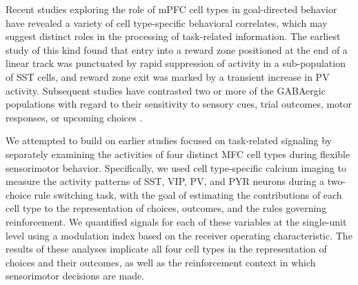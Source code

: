 Recent studies exploring the role of mPFC cell types in goal-directed behavior have revealed a variety of cell type-specific behavioral correlates, which may suggest distinct roles in the processing of task-related information. The earliest study of this kind \citep{kvitsiani2013distinct} found that entry into a reward zone positioned at the end of a linear track was punctuated by rapid suppression of activity in a sub-population of SST cells, and reward zone exit was marked by a transient increase in PV activity. Subsequent studies have contrasted two or more of the GABAergic populations with regard to their sensitivity to sensory cues, trial outcomes, motor responses, or upcoming choices \citep{pinto2015cell,kim2016distinct}.

We attempted to build on earlier studies focused on task-related signaling by separately examining the activities of four distinct MFC cell types during flexible sensorimotor behavior. Specifically, we used cell type-specific calcium imaging to measure the activity patterns of SST, VIP, PV, and PYR neurons during a two-choice rule switching task, with the goal of estimating the contributions of each cell type to the representation of choices, outcomes, and the rules governing reinforcement. We quantified signals for each of these variables at the single-unit level using a modulation index based on the receiver operating characteristic. The results of these analyses implicate all four cell types in the representation of choices and their outcomes, as well as the reinforcement context in which sensorimotor decisions are made. 